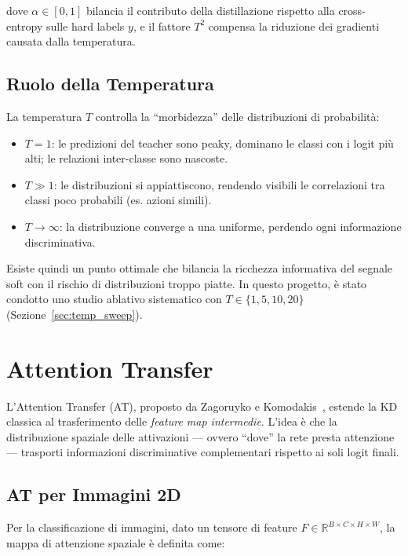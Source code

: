 dove $\alpha \in [0, 1]$ bilancia il contributo della distillazione rispetto alla cross-entropy sulle hard labels $y$, e il fattore $T^2$ compensa la riduzione dei gradienti causata dalla temperatura.

\subsection{Ruolo della Temperatura}

La temperatura $T$ controlla la ``morbidezza'' delle distribuzioni di probabilità:
\begin{itemize}
    \item \textbf{$T = 1$}: le predizioni del teacher sono peaky, dominano le classi con i logit più alti; le relazioni inter-classe sono nascoste.
    \item \textbf{$T \gg 1$}: le distribuzioni si appiattiscono, rendendo visibili le correlazioni tra classi poco probabili (es. azioni simili).
    \item \textbf{$T \to \infty$}: la distribuzione converge a una uniforme, perdendo ogni informazione discriminativa.
\end{itemize}

Esiste quindi un punto ottimale che bilancia la ricchezza informativa del segnale soft con il rischio di distribuzioni troppo piatte. In questo progetto, è stato condotto uno studio ablativo sistematico con $T \in \{1, 5, 10, 20\}$ (Sezione~\ref{sec:temp_sweep}).

\section{Attention Transfer}
\label{sec:at_background}

L'Attention Transfer (AT), proposto da Zagoruyko e Komodakis~\cite{zagoruyko2017paying}, estende la KD classica al trasferimento delle \textit{feature map intermedie}. L'idea è che la distribuzione spaziale delle attivazioni --- ovvero ``dove'' la rete presta attenzione --- trasporti informazioni discriminative complementari rispetto ai soli logit finali.

\subsection{AT per Immagini 2D}

Per la classificazione di immagini, dato un tensore di feature $F \in \mathbb{R}^{B \times C \times H \times W}$, la mappa di attenzione spaziale è definita come:

